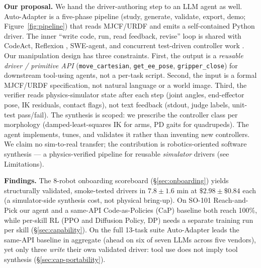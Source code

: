 \noindent\textbf{Our proposal.}
We hand the driver-authoring step to an LLM agent as well.
Auto-Adapter is a five-phase pipeline (study, generate,
validate, export, demo; Figure~\ref{fig:pipeline}) that reads
MJCF/URDF and emits a self-contained Python driver. The inner
``write code, run, read feedback, revise'' loop is shared with
CodeAct, Reflexion \citep{shinn2023reflexion}, SWE-agent, and
concurrent test-driven controller work \citep{tripathi2026testdriven}.
Our manipulation design has three constraints. First, the output
is a \emph{reusable driver / primitive API} (\texttt{move\_cartesian},
\texttt{get\_ee\_pose}, \texttt{gripper\_close}) for downstream
tool-using agents, not a per-task script. Second, the input is a
formal MJCF/URDF specification, not natural language or a world
image. Third, the verifier reads physics-simulator state after each
step (joint angles, end-effector pose, IK residuals, contact flags),
not text feedback (stdout, judge labels, unit-test pass/fail). The synthesis is scoped: we prescribe the controller class per
morphology (damped-least-squares IK for arms, PD gaits for
quadrupeds). The agent implements, tunes, and validates it rather
than inventing new controllers. We claim no sim-to-real transfer;
the contribution is robotics-oriented software synthesis --- a
physics-verified pipeline for reusable \emph{simulator} drivers
(see Limitations).

\noindent\textbf{Findings.}
The 8-robot onboarding scoreboard (\S\ref{sec:onboarding})
yields structurally validated, smoke-tested drivers in
$7.8 \pm 1.6$ min at $\$2.98 \pm \$0.84$ each (a simulator-side
synthesis cost, not physical bring-up). On SO-101 Reach-and-Pick
our agent and a same-API Code-as-Policies (CaP) baseline both reach 100\%,
while per-skill RL (PPO and Diffusion Policy, DP) needs a separate training
run per skill (\S\ref{sec:capability}). On the full 13-task suite
Auto-Adapter leads the same-API baseline in aggregate (ahead on six
of seven LLMs across five vendors), yet only three \emph{write} their own validated
driver: tool use does not imply tool synthesis
(\S\ref{sec:cap-portability}).

